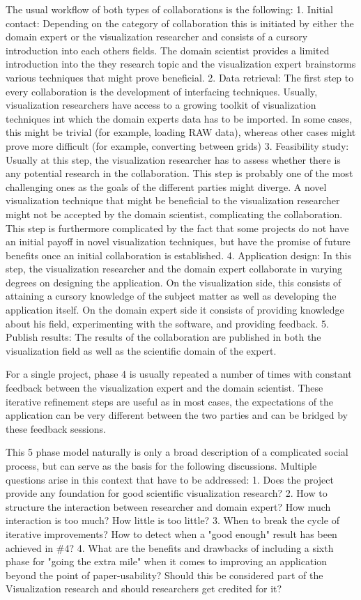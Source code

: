 The usual workflow of both types of collaborations is the following:
1. Initial contact: Depending on the category of collaboration this is initiated by either the domain expert or the visualization researcher and consists of a cursory introduction into each others fields. The domain scientist provides a limited introduction into the they research topic and the visualization expert brainstorms various techniques that might prove beneficial.
2. Data retrieval: The first step to every collaboration is the development of interfacing techniques. Usually, visualization researchers have access to a growing toolkit of visualization techniques int which the domain experts data has to be imported. In some cases, this might be trivial (for example, loading RAW data), whereas other cases might prove more difficult (for example, converting between grids)
3. Feasibility study: Usually at this step, the visualization researcher has to assess whether there is any potential research in the collaboration. This step is probably one of the most challenging ones as the goals of the different parties might diverge. A novel visualization technique that might be beneficial to the visualization researcher might not be accepted by the domain scientist, complicating the collaboration. This step is furthermore complicated by the fact that some projects do not have an initial payoff in novel visualization techniques, but have the promise of future benefits once an initial collaboration is established. 
4. Application design: In this step, the visualization researcher and the domain expert collaborate in varying degrees on designing the application. On the visualization side, this consists of attaining a cursory knowledge of the subject matter as well as developing the application itself. On the domain expert side it consists of providing knowledge about his field, experimenting with the software, and providing feedback.
5. Publish results: The results of the collaboration are published in both the visualization field as well as the scientific domain of the expert.

For a single project, phase 4 is usually repeated a number of times with constant feedback between the visualization expert and the domain scientist. These iterative refinement steps are useful as in most cases, the expectations of the application can be very different between the two parties and can be bridged by these feedback sessions.

This 5 phase model naturally is only a broad description of a complicated social process, but can serve as the basis for the following discussions. Multiple questions arise in this context that have to be addressed:
 1. Does the project provide any foundation for good scientific visualization research?
 2. How to structure the interaction between researcher and domain expert? How much interaction is too much? How little is too little?
 3. When to break the cycle of iterative improvements? How to detect when a "good enough" result has been achieved in \#4?
 4. What are the benefits and drawbacks of including a sixth phase for "going the extra mile" when it comes to improving an application beyond the point of paper-usability? Should this be considered part of the Visualization research and should researchers get credited for it?


